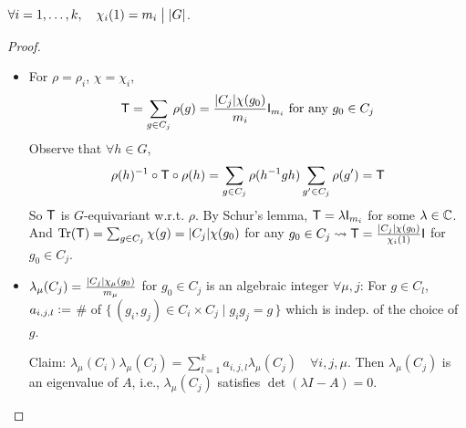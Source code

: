 \begin{theorem}[Divisibility]
  $\forall i = 1, \dots, k, \quad \chi_i(1) = m_i \mathrel{\big|} \lvert G\rvert$.

  \begin{proof} \mbox{}
    \begin{itemize}
      \item For $\rho=\rho_i$, $\chi = \chi_i$,
        \[
          {\sf T} = \sum_{g\in C_j} \rho(g) = \frac{\lvert C_j\rvert\chi(g_0)}{m_i}
          {\sf I}_{m_i} \text{~for any~} g_0 \in C_j
        \]
        Observe that $\forall h \in G$,
        \[
          \rho(h)^{-1}\circ{\sf T}\circ\rho(h) = \sum_{g\in C_j} \rho(h^{-1}gh)
          \sum_{g'\in C_j} \rho(g') = {\sf T}
        \]
        So ${\sf T}$ is $G$-equivariant w.r.t. $\rho$.
        By Schur's lemma, ${\sf T} = \lambda {\sf I}_{m_i}$ for some $\lambda \in \mathbb{C}$.
        And $\operatorname{Tr}({\sf T}) = \sum_{g\in C_j} \chi(g) = \lvert C_j\rvert\chi(g_0)$
        for any $g_0 \in C_j \leadsto {\sf T} =
        \frac{\lvert C_j\rvert\chi(g_0)}{\chi_i(1)} {\sf I}$ for $g_0 \in C_j$.
      \item $\lambda_\mu(C_j) = \frac{\lvert C_j\rvert\chi_\mu(g_0)}{m_\mu}$ for
        $g_0 \in C_j$ is an algebraic integer $\forall \mu, j$:
        For $g\in C_l$, $a_{i,j,l} \vcentcolon=$ \# of $\{\, (g_i, g_j) \in C_i \times C_j \mid
        g_ig_j = g \,\}$ which is indep. of the choice of $g$.

        Claim: $\lambda_\mu(C_i)\lambda_\mu(C_j) = \sum_{l=1}^k a_{i,j,l} \lambda_\mu(C_j)
        \quad \forall i, j, \mu$. Then $\lambda_\mu(C_j)$ is an eigenvalue of
        $A$, i.e., $\lambda_\mu(C_j)$ satisfies $\det(\lambda I - A) = 0$.


\end{itemize}
\end{proof}
\end{theorem}
